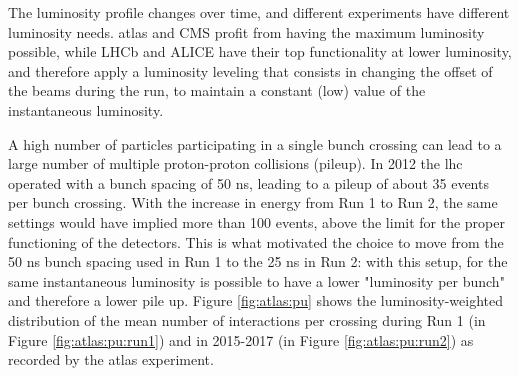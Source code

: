 The luminosity profile changes over time, and different experiments have different luminosity needs. \gls{atlas} and CMS profit from having the maximum luminosity possible, while LHCb and ALICE have their top functionality at lower luminosity, and therefore apply a luminosity leveling that consists in changing the offset of the beams during the run, to maintain a constant (low) value of the instantaneous luminosity.

A high number of particles participating in a single bunch crossing can lead to a large number of multiple proton-proton collisions (pileup). In 2012 the \gls{lhc} operated with a bunch spacing of 50 ns, leading to a pileup of about 35 events per bunch crossing. With the increase in energy from Run 1 to Run 2, the same settings would have implied more than 100 events, above the limit for the proper functioning of the detectors. This is what motivated the choice to move from the 50 ns bunch spacing used in Run 1 to the 25 ns in Run 2: with this setup, for the same instantaneous luminosity is possible to have a lower "luminosity per bunch" and therefore a lower pile up. Figure \ref{fig:atlas:pu} shows the luminosity-weighted distribution of the mean number of interactions per crossing during Run 1 (in Figure \ref{fig:atlas:pu:run1})
and in 2015-2017 (in Figure \ref{fig:atlas:pu:run2}) as recorded by the \gls{atlas} experiment.

